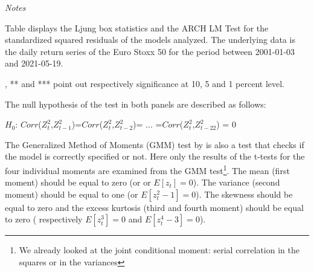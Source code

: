 \documentclass[a4paper, nobind]{templates/ociamthesis}
\begin{document}
\begin{landscape}
\begin{table}[h!]
\begin{threeparttable}
{\begin{tabular}[t]{lllllllll}
\bottomrule
\end{tabular}}
\begin{tablenotes}
\item \textit{Notes} 
\item Table displays the Ljung box statistics and the ARCH LM Test for the standardized squared residuals of the models analyzed. The underlying data is the daily return series of the Euro Stoxx 50 for the period between 2001-01-03 and 2021-05-19.
\item *, ** and *** point out respectively significance at 10, 5 and 1 percent level.
\item The null hypothesis of the test in both panels are described as follows:
\item $H_0$: $Corr$($Z_t^2$,$Z_{t-1}^2$)=$Corr$($Z_t^2$,$Z_{t-2}^2$)= $...$ =$Corr$($Z_t^2$,$Z_{t-22}^2$) = $0$
\end{tablenotes}
\end{threeparttable}
\end{table}
\end{landscape}

The Generalized Method of Moments (GMM) test by \textcite{hansen1982} is also a test that checks if the model is correctly specified or not. Here only the results of the t-tests for the four individual moments are examined from the GMM test\footnote{We already looked at the joint conditional moment: serial correlation in the squares or in the variances}. The mean (first moment) should be equal to zero (or or \(E\left[z_{t}\right]=0\)). The variance (second moment) should be equal to one (or \(E\left[z_{t}^2-1\right]=0\)). The skewness should be equal to zero and the excess kurtosis (third and fourth moment) should be equal to zero ( respectively \(E\left[z_{t}^3\right]=0\) and \(E\left[z_{t}^4-3\right] = 0\)).
\end{document}
